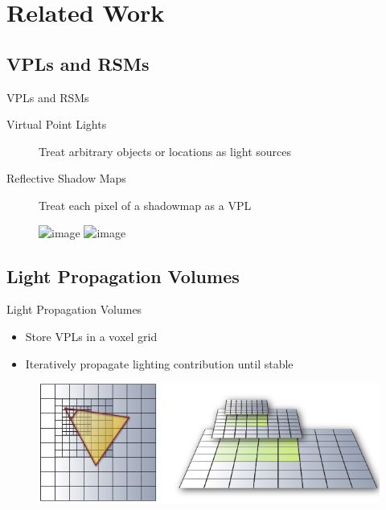 \documentclass[10pt]{beamer}
\begin{document}

\section{Related Work}

\subsection{VPLs and RSMs}
\begin{frame}{VPLs and RSMs}
  \begin{description}
    \item[Virtual Point Lights] Treat arbitrary objects or locations as light sources
    \item[Reflective Shadow Maps] Treat each pixel of a shadowmap as a VPL %
  \end{description}

  \begin{figure}
    \includegraphics<+>[width=\textwidth]{rsm.png}
    \includegraphics<+>[width=\textwidth]{rsm_vpl.png}
  \end{figure}

\end{frame}

\subsection{Light Propagation Volumes}
\begin{frame}{Light Propagation Volumes}

  \begin{itemize}
    \item Store VPLs in a voxel grid
    \item Iteratively propagate lighting contribution until stable
  \end{itemize}

  \begin{figure}
    \includegraphics[width=\textwidth]{lpv.png}
  \end{figure}
\end{frame}
\end{document}
